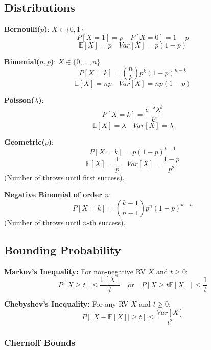 \subsection{Distributions}

\begin{definition}
\textbf{Bernoulli($p$)}: $X \in \{0,1\}$
$$P[X=1] = p \quad P[X=0] = 1-p$$
$$\mathbb{E}[X] = p \quad Var[X] = p(1-p)$$
\end{definition}

\begin{definition}
\textbf{Binomial($n, p$)}: $X \in \{0,\dots,n\}$
$$P[X=k] = \binom{n}{k} p^k (1-p)^{n-k}$$
$$\mathbb{E}[X] = np \quad Var[X] = np(1-p)$$
\end{definition}

\begin{definition}
\textbf{Poisson($\lambda$)}:
$$P[X=k] = \frac{e^{-\lambda} \lambda^k}{k!}$$
$$\mathbb{E}[X] = \lambda \quad Var[X] = \lambda$$
\end{definition}

\begin{definition}
\textbf{Geometric($p$)}:
$$P[X=k] = p(1-p)^{k-1}$$
$$\mathbb{E}[X] = \frac{1}{p} \quad Var[X] = \frac{1-p}{p^2}$$
(Number of throws until first success).
\end{definition}

\begin{definition}
\textbf{Negative Binomial of order $n$}:
$$P[X=k] = \binom{k-1}{n-1} p^n (1-p)^{k-n}$$
(Number of throws until $n$-th success).
\end{definition}

\subsection{Bounding Probability}

\begin{theorem}
    \textbf{Markov's Inequality:} For non-negative RV $X$ and $t \ge 0$:
    $$P[X \geq t] \leq \frac{\mathbb{E}[X]}{t} \quad \text{or} \quad P[X \geq t \mathbb{E}[X]] \leq \frac{1}{t}$$
\end{theorem}

\begin{theorem}
    \textbf{Chebyshev's Inequality:} For any RV $X$ and $t \ge 0$:
    $$P[|X-\mathbb{E}[X]| \geq t] \leq \frac{Var[X]}{t^2}$$
\end{theorem}

\subsubsection{Chernoff Bounds}

